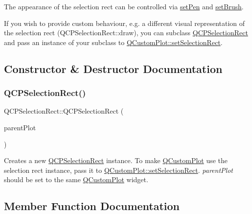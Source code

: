 The appearance of the selection rect can be controlled via \mbox{\hyperlink{class_q_c_p_selection_rect_ada20b7fb1b2dcbe50523262636b06963}{set\+Pen}} and \mbox{\hyperlink{class_q_c_p_selection_rect_ab0c66f1484418782efa01f4153611080}{set\+Brush}}.

If you wish to provide custom behaviour, e.\+g. a different visual representation of the selection rect (Q\+C\+P\+Selection\+Rect\+::draw), you can subclass \mbox{\hyperlink{class_q_c_p_selection_rect}{Q\+C\+P\+Selection\+Rect}} and pass an instance of your subclass to \mbox{\hyperlink{class_q_custom_plot_a0c09f96df15faa4799ad7051bb16cf33}{Q\+Custom\+Plot\+::set\+Selection\+Rect}}. 

\subsection{Constructor \& Destructor Documentation}
\mbox{\label{class_q_c_p_selection_rect_ade6ee59fabcc585a1e281eb527b01867}} 
\subsubsection{\texorpdfstring{Q\+C\+P\+Selection\+Rect()}{QCPSelectionRect()}}
{\footnotesize\ttfamily Q\+C\+P\+Selection\+Rect\+::\+Q\+C\+P\+Selection\+Rect (\begin{DoxyParamCaption}\item[{\mbox{\hyperlink{class_q_custom_plot}{Q\+Custom\+Plot}} $\ast$}]{parent\+Plot }\end{DoxyParamCaption})\hspace{0.3cm}{\ttfamily [explicit]}}

Creates a new \mbox{\hyperlink{class_q_c_p_selection_rect}{Q\+C\+P\+Selection\+Rect}} instance. To make \mbox{\hyperlink{class_q_custom_plot}{Q\+Custom\+Plot}} use the selection rect instance, pass it to \mbox{\hyperlink{class_q_custom_plot_a0c09f96df15faa4799ad7051bb16cf33}{Q\+Custom\+Plot\+::set\+Selection\+Rect}}. {\itshape parent\+Plot} should be set to the same \mbox{\hyperlink{class_q_custom_plot}{Q\+Custom\+Plot}} widget. 

\subsection{Member Function Documentation}
\mbox{\label{class_q_c_p_selection_rect_a15a43542e1f7b953a44c260b419e6d2c}} 
